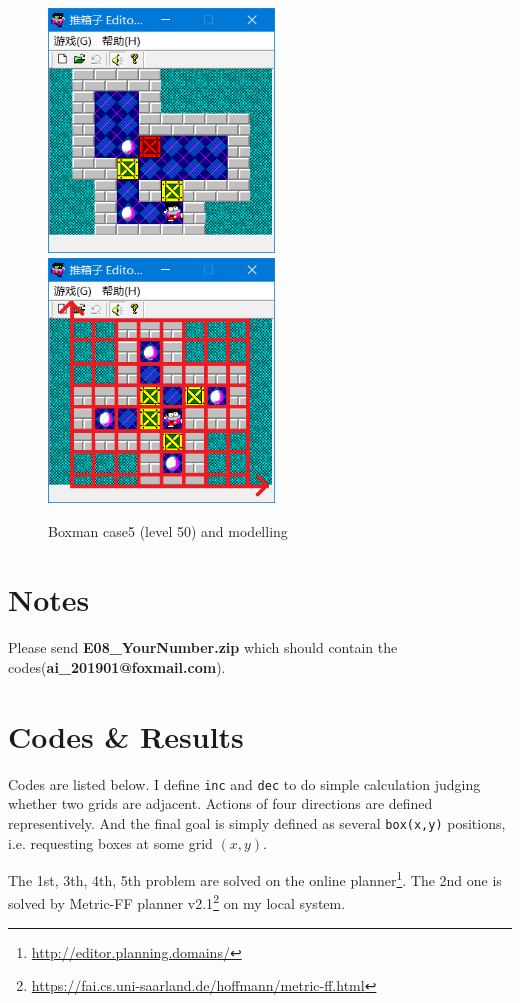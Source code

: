 \documentclass[a4paper, 11pt]{article}
\begin{document}
\begin{figure}[h]
  \centering
  \includegraphics[width=6cm]{fig/case5}
  \qquad
  \includegraphics[width=6cm]{fig/model}
  \caption{Boxman case5 (level 50) and modelling}
\end{figure}

\section{Notes}
\par Please send \textbf{E08\_YourNumber.zip} which should contain the codes(\textbf{ai\_201901@foxmail.com}).

\section{Codes \& Results}
Codes are listed below.
I define \verb'inc' and \verb'dec' to do simple calculation judging whether two grids are adjacent.
Actions of four directions are defined representively.
And the final goal is simply defined as several \verb'box(x,y)' positions, i.e. requesting boxes at some grid $(x,y)$.

The 1st, 3th, 4th, 5th problem are solved on the online planner\footnote{\url{http://editor.planning.domains/}}.
The 2nd one is solved by Metric-FF planner v2.1\footnote{\url{https://fai.cs.uni-saarland.de/hoffmann/metric-ff.html}} on my local system.
\end{document}

